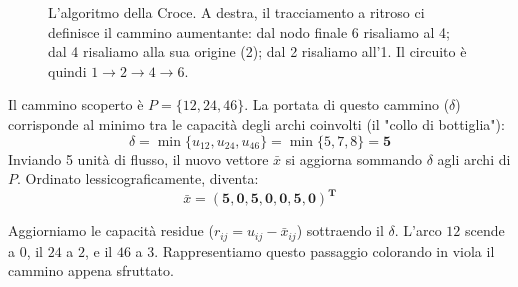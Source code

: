 \documentclass[12pt, a4paper]{article}
\begin{document}
\begin{figure}[H]
\begin{minipage}{0.45\textwidth}
			\caption*{Tabella 2: Backtracking del Cammino}
		\end{minipage}
		\caption{L'algoritmo della Croce. A destra, il tracciamento a ritroso ci definisce il cammino aumentante: dal nodo finale 6 risaliamo al 4; dal 4 risaliamo alla sua origine (2); dal 2 risaliamo all'1. Il circuito è quindi $1 \to 2 \to 4 \to 6$.}
	\end{figure}
	
	Il cammino scoperto è $P = \{12, 24, 46\}$. 
	La portata di questo cammino ($\delta$) corrisponde al minimo tra le capacità degli archi coinvolti (il "collo di bottiglia"):
	\[ \delta = \min \{ u_{12}, u_{24}, u_{46} \} = \min \{ 5, 7, 8 \} = \mathbf{5} \]
	Inviando 5 unità di flusso, il nuovo vettore $\bar{x}$ si aggiorna sommando $\delta$ agli archi di $P$. Ordinato lessicograficamente, diventa:
	\[ \bar{x} = \mathbf{(5, 0, 5, 0, 0, 5, 0)^T} \]
	
	Aggiorniamo le capacità residue ($r_{ij} = u_{ij} - \bar{x}_{ij}$) sottraendo il $\delta$. L'arco $12$ scende a $0$, il $24$ a $2$, e il $46$ a $3$. Rappresentiamo questo passaggio colorando in viola il cammino appena sfruttato.
	
\end{document}
